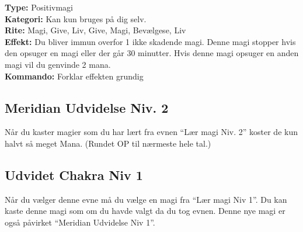 \begin{lærmagi*}
\textbf{Type:} Positivmagi\\
\textbf{Kategori:} Kan kun bruges på dig selv.\\
\textbf{Rite:} Magi, Give, Liv, Give, Magi, Bevælgese, Liv\\
\textbf{Effekt:} Du bliver immun overfor 1 ikke skadende magi. Denne magi stopper hvis den opsuger en magi eller der går 30 minutter. Hvis denne magi opsuger en anden magi vil du genvinde 2 mana.\\
\textbf{Kommando:} Forklar effekten grundig\\
\end{lærmagi*}


\subsection{Meridian Udvidelse Niv. 2}
Når du kaster magier som du har lært fra evnen “Lær magi Niv. 2” koster de kun halvt så meget Mana. (Rundet OP til nærmeste hele tal.)

\subsection{Udvidet Chakra Niv 1}
Når du vælger denne evne må du vælge en magi fra “Lær magi Niv 1”. Du kan kaste denne magi som om du havde valgt da du tog evnen. Denne nye magi er også påvirket “Meridian Udvidelse Niv 1”.


